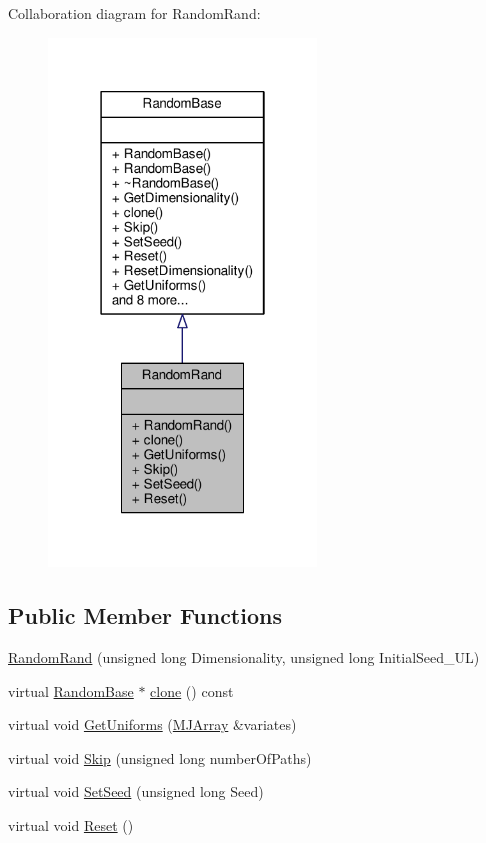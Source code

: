 Collaboration diagram for Random\+Rand\+:
\nopagebreak
\begin{figure}[H]
\begin{center}
\leavevmode
\includegraphics[width=202pt]{classRandomRand__coll__graph}
\end{center}
\end{figure}
\subsection*{Public Member Functions}
\begin{DoxyCompactItemize}
\item 
\hyperlink{classRandomRand_a49f39d6181f10816e1a71fccfb706d77}{Random\+Rand} (unsigned long Dimensionality, unsigned long Initial\+Seed\+\_\+U\+L)
\item 
virtual \hyperlink{classRandomBase}{Random\+Base} $\ast$ \hyperlink{classRandomRand_a7499fbf182a11829cac3068bc66ffe22}{clone} () const
\item 
virtual void \hyperlink{classRandomRand_acd17f14742903f5b88f9b1175f16098c}{Get\+Uniforms} (\hyperlink{classMJArray}{M\+J\+Array} \&variates)
\item 
virtual void \hyperlink{classRandomRand_ab9e2f1049a7421aef97144a7aedd8d4b}{Skip} (unsigned long number\+Of\+Paths)
\item 
virtual void \hyperlink{classRandomRand_abccae7b9cb11121a461e15959536843c}{Set\+Seed} (unsigned long Seed)
\item 
virtual void \hyperlink{classRandomRand_a27bd392590f772d66ba75781964ff2c9}{Reset} ()
\end{DoxyCompactItemize}


